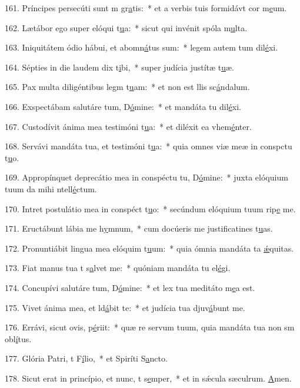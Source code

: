 161. Príncipes persecúti sunt m gr\uline{a}tis:~* et a verbis tuis formidávt cor m\uline{e}um.\par 
162. Lætábor ego super elóqui t\uline{u}a:~* sicut qui invénit spóla m\uline{u}lta.\par 
163. Iniquitátem ódio hábui, et abomn\uline{á}tus sum:~* legem autem tum dil\uline{é}xi.\par 
164. Sépties in die laudem dix t\uline{i}bi,~* super judícia justítæ t\uline{u}æ.\par 
165. Pax multa diligéntibus legm t\uline{u}am:~* et non est llis sc\uline{á}ndalum.\par 
166. Exspectábam salutáre tum, D\uline{ó}mine:~* et mandáta tu dil\uline{é}xi.\par 
167. Custodívit ánima mea testimóni t\uline{u}a:~* et diléxit ea vhem\uline{é}nter.\par 
168. Servávi mandáta tua, et testimóni t\uline{u}a:~* quia omnes viæ meæ in conspctu t\uline{u}o.\par 
169. Appropínquet deprecátio mea in conspéctu tu, D\uline{ó}mine:~* juxta elóquium tuum da mihi ntell\uline{é}ctum.\par 
170. Intret postulátio mea in conspéct t\uline{u}o:~* secúndum elóquium tuum rip\uline{e} me.\par 
171. Eructábunt lábia me h\uline{y}mnum,~* cum docúeris me justificatines t\uline{u}as.\par 
172. Pronuntiábit lingua mea elóquim t\uline{u}um:~* quia ómnia mandáta ta \uline{ǽ}quitas.\par 
173. Fiat manus tua t s\uline{a}lvet me:~* quóniam mandáta tu el\uline{é}gi.\par 
174. Concupívi salutáre tum, D\uline{ó}mine:~* et lex tua meditáto m\uline{e}a est.\par 
175. Vivet ánima mea, et ld\uline{á}bit te:~* et judícia tua djuv\uline{á}bunt me.\par 
176. Errávi, sicut ovis,  p\uline{é}riit:~* quæ re servum tuum, quia mandáta tua non sm obl\uline{í}tus.\par 
177. Glória Patri, t F\uline{í}lio,~* et Spiríti S\uline{a}ncto.\par 
178. Sicut erat in princípio, et nunc, t s\uline{e}mper,~* et in sǽcula sæculrum. \uline{A}men.\par 

